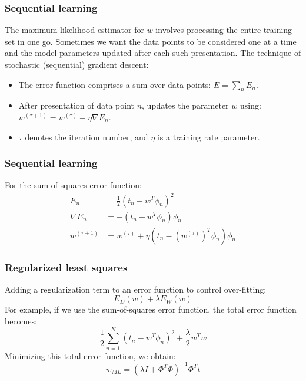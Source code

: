 \documentclass{beamer}
\begin{document}
\begin{frame}
    \frametitle{Sequential learning}
    The maximum likelihood estimator for $w$ involves processing the entire training set in one go. Sometimes we want the data points to be considered one at a time and the model parameters updated after each such presentation. The technique of stochastic
    (sequential) gradient descent:
    \begin{itemize}
        \item The error function comprises a sum over data points: $E=\sum_{n}E_{n}$.
        \item After presentation of data point $n$, updates the parameter $w$ using: $w^{(\tau+1)}=w^{(\tau)}-\eta\nabla{}E_{n}$.
        \item $\tau$ denotes the iteration number, and $\eta$ is a training rate parameter.
    \end{itemize}
\end{frame}

\begin{frame}
    \frametitle{Sequential learning}
    For the sum-of-squares error function:
    \begin{align*}
        E_{n}&=\frac{1}{2}(t_{n}-w^{T}\phi_{n})^{2} \\
        \nabla{}E_{n}&=-(t_{n}-w^{T}\phi_{n})\phi_{n} \\
        w^{(\tau+1)}&=w^{(\tau)}+\eta(t_{n}-(w^{(\tau)})^{T}\phi_{n})\phi_{n}
    \end{align*}
\end{frame}

\begin{frame}
    \frametitle{Regularized least squares}
    Adding a regularization term to an error function to control over-fitting:
    \begin{equation*}
        E_{D}(w)+\lambda{}E_{W}(w)
    \end{equation*}
    For example, if we use the sum-of-squares error function, the total error function becomes:
    \begin{equation*}
        \frac{1}{2}\sum_{n=1}^{N}(t_{n}-w^{T}\phi_{n})^{2}+\frac{\lambda}{2}w^{T}w
    \end{equation*}
    Minimizing this total error function, we obtain:
    \begin{equation*}
        w_{ML}=(\lambda{}I+\Phi^{T}\Phi)^{-1}\Phi^{T}t
    \end{equation*}
\end{frame}
\end{document}
